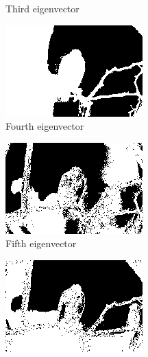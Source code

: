 \documentclass[11pt]{article}
\begin{document}
\begin{figure}
\begin{subfigure}[b]{0.4\textwidth}
\caption{Third eigenvector}
\label{fig:ev3:r10}
\end{subfigure}
\begin{subfigure}[b]{0.4\textwidth}
\centering
\includegraphics[width=\textwidth]{hawk_10_seg_ev4}
\caption{Fourth eigenvector}
\label{fig:ev4:r10}
\end{subfigure}
\begin{subfigure}[b]{0.4\textwidth}
\centering
\includegraphics[width=\textwidth]{hawk_10_seg_ev5}
\caption{Fifth eigenvector}
\label{fig:ev5:r10}
\end{subfigure}
\begin{subfigure}[b]{0.4\textwidth}
\centering
\includegraphics[width=\textwidth]{hawk_10_seg_ev6}

\end{subfigure}
\end{figure}
\end{document}
